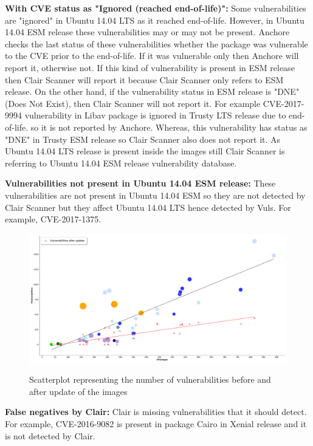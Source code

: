 \documentclass[a4paper,num-refs]{oup-contemporary}
\begin{document}
\textbf{With CVE status as "Ignored (reached end-of-life)":}
Some vulnerabilities are "ignored" in Ubuntu 14.04 LTS as it reached end-of-life. 
However, in Ubuntu 14.04 ESM release these vulnerabilities may or may not be present.
Anchore checks the last status of these vulnerabilities whether the package was vulnerable to the CVE
prior to the end-of-life. If it was vulnerable only then Anchore will report it, otherwise not.
If this kind of vulnerability is present in ESM release then Clair Scanner will report it because Clair Scanner
only refers to ESM release. On the other hand, if the vulnerability
status in ESM release is "DNE" (Does Not Exist), then Clair Scanner will not report it. 
For example CVE-2017-9994 vulnerability in Libav package is ignored in Trusty LTS release due to end-of-life.
so it is not reported by Anchore. Whereas, this vulnerability has status as "DNE" in Trusty ESM
release so Clair Scanner also does not report it. As Ubuntu 14.04 LTS release is present inside the images still
Clair Scanner is referring to Ubuntu 14.04 ESM release vulnerability database.

\textbf{Vulnerabilities not present in Ubuntu 14.04 ESM release:} These vulnerabilities are not present in Ubuntu 14.04 ESM so they 
are not detected by Clair Scanner but they affect Ubuntu 14.04 LTS hence detected by Vuls. For example, CVE-2017-1375.
\begin{figure}[b]
        {\includegraphics[width=\textwidth]
        {Figures/vulnwithupdate.pdf}}
        \caption{\label{fig:graph2} Scatterplot representing the number of vulnerabilities before and
        after update of the images}
      \end{figure}

\textbf{False negatives by Clair:} Clair is missing vulnerabilities that it should detect. For example, CVE-2016-9082 
is present in package Cairo in Xenial release and it is not detected by Clair.
\end{document}
